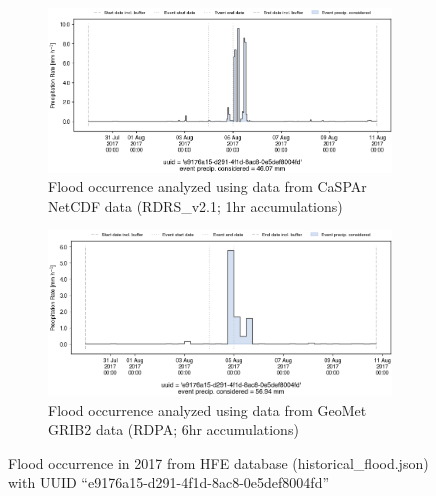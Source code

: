 \documentclass[10pt,a4paper,titlepage,parskip]{scrartcl}
\begin{document}
\begin{figure}[h]
	\begin{subfigure}[a]{1.0\textwidth}
		\centering
		\includegraphics[width=\linewidth]{figures/compare_Geomet_CaSPAr/interpolated_at_stations_occurrence_1058_identified-timesteps_RDRS_v2.1.png}
		\caption{Flood occurrence analyzed using data from CaSPAr NetCDF data (RDRS\_v2.1; 1hr accumulations)}
	\end{subfigure}
	\par\bigskip\bigskip
	\begin{subfigure}[b]{1.0\textwidth}
		\centering
		\includegraphics[width=\linewidth]{figures/compare_Geomet_CaSPAr/interpolated_at_stations_occurrence_1058_identified-timesteps_rdpa:10km:6f.png}
		\caption{Flood occurrence analyzed using data from GeoMet GRIB2 data (RDPA; 6hr accumulations)}
	\end{subfigure}
	\par\bigskip\bigskip
	\caption{Flood occurrence in 2017 from HFE database (historical\_flood.json) with UUID ``e9176a15-d291-4f1d-8ac8-0e5def8004fd''}
\end{figure}
\pagebreak
\end{document}
